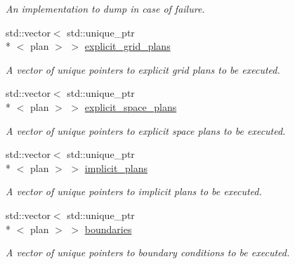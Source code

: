 \begin{DoxyCompactItemize}
\begin{DoxyCompactList}\small\item\em An implementation to dump in case of failure. \end{DoxyCompactList}\item 
\hypertarget{classbases_1_1element_ac4279079d360b935914250d971055926}{std\-::vector$<$ std\-::unique\-\_\-ptr\\*
$<$ plan $>$ $>$ \hyperlink{classbases_1_1element_ac4279079d360b935914250d971055926}{explicit\-\_\-grid\-\_\-plans}}\label{classbases_1_1element_ac4279079d360b935914250d971055926}

\begin{DoxyCompactList}\small\item\em A vector of unique pointers to explicit grid plans to be executed. \end{DoxyCompactList}\item 
\hypertarget{classbases_1_1element_ac213ee9d5e2b9dd4f9889fd6183064d6}{std\-::vector$<$ std\-::unique\-\_\-ptr\\*
$<$ plan $>$ $>$ \hyperlink{classbases_1_1element_ac213ee9d5e2b9dd4f9889fd6183064d6}{explicit\-\_\-space\-\_\-plans}}\label{classbases_1_1element_ac213ee9d5e2b9dd4f9889fd6183064d6}

\begin{DoxyCompactList}\small\item\em A vector of unique pointers to explicit space plans to be executed. \end{DoxyCompactList}\item 
\hypertarget{classbases_1_1element_a238aea68f2f520d2b681ff4e0a9bb5d0}{std\-::vector$<$ std\-::unique\-\_\-ptr\\*
$<$ plan $>$ $>$ \hyperlink{classbases_1_1element_a238aea68f2f520d2b681ff4e0a9bb5d0}{implicit\-\_\-plans}}\label{classbases_1_1element_a238aea68f2f520d2b681ff4e0a9bb5d0}

\begin{DoxyCompactList}\small\item\em A vector of unique pointers to implicit plans to be executed. \end{DoxyCompactList}\item 
\hypertarget{classbases_1_1element_a4b0d20dc02fe4e1fe92e100ea332ea22}{std\-::vector$<$ std\-::unique\-\_\-ptr\\*
$<$ plan $>$ $>$ \hyperlink{classbases_1_1element_a4b0d20dc02fe4e1fe92e100ea332ea22}{boundaries}}\label{classbases_1_1element_a4b0d20dc02fe4e1fe92e100ea332ea22}

\begin{DoxyCompactList}\small\item\em A vector of unique pointers to boundary conditions to be executed. \end{DoxyCompactList}\end{DoxyCompactItemize}


